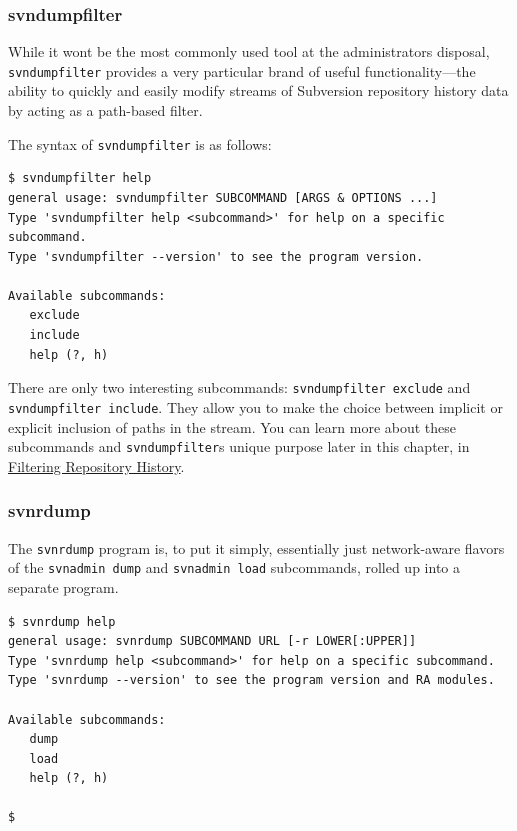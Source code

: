 \subsubsection{svndumpfilter}\label{svn.reposadmin.maint.tk.svndumpfilter}

While it won\textquotesingle t be the most commonly used tool at the
administrator\textquotesingle s disposal, \texttt{svndumpfilter}
provides a very particular brand of useful functionality---the ability
to quickly and easily modify streams of Subversion repository history
data by acting as a path-based filter.

The syntax of \texttt{svndumpfilter} is as follows:

\begin{verbatim}
$ svndumpfilter help
general usage: svndumpfilter SUBCOMMAND [ARGS & OPTIONS ...]
Type 'svndumpfilter help <subcommand>' for help on a specific subcommand.
Type 'svndumpfilter --version' to see the program version.
  
Available subcommands:
   exclude
   include
   help (?, h)
\end{verbatim}

There are only two interesting subcommands:
\texttt{svndumpfilter\ exclude} and \texttt{svndumpfilter\ include}.
They allow you to make the choice between implicit or explicit inclusion
of paths in the stream. You can learn more about these subcommands and
\texttt{svndumpfilter}\textquotesingle s unique purpose later in this
chapter, in \hyperref[svn.reposadmin.maint.filtering]{Filtering
Repository History}.

\subsubsection{svnrdump}\label{svn.reposadmin.maint.tk.svnrdump}

The \texttt{svnrdump} program is, to put it simply, essentially just
network-aware flavors of the \texttt{svnadmin\ dump} and
\texttt{svnadmin\ load} subcommands, rolled up into a separate program.

\begin{verbatim}
$ svnrdump help
general usage: svnrdump SUBCOMMAND URL [-r LOWER[:UPPER]]
Type 'svnrdump help <subcommand>' for help on a specific subcommand.
Type 'svnrdump --version' to see the program version and RA modules.

Available subcommands:
   dump
   load
   help (?, h)

$
\end{verbatim}

